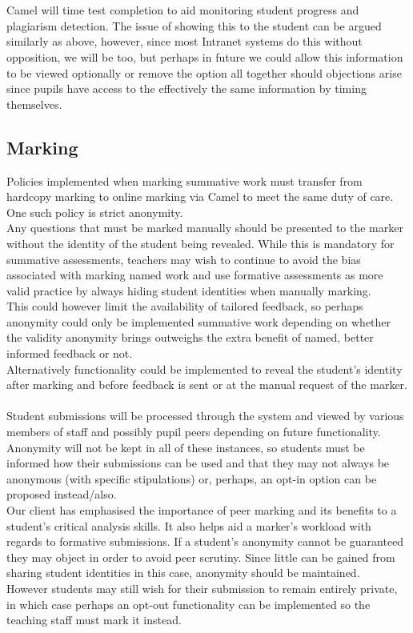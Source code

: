 \\\\Camel will time test completion to aid monitoring student progress and plagiarism detection. The issue of showing this to the student can be argued similarly as above, however, since most Intranet systems do this without opposition, we will be too, but perhaps in future we could allow this information to be viewed optionally or remove the option all together should objections arise since pupils have access to the effectively the same information by timing themselves.
\subsection*{Marking}
Policies implemented when marking summative work must transfer from hardcopy marking to online marking via Camel to meet the same duty of care. One such policy is strict anonymity.
\\Any questions that must be marked manually should be presented to the marker without the identity of the student being revealed. While this is mandatory for summative assessments, teachers may wish to continue to avoid the bias associated with marking named work and use formative assessments as more valid practice by always hiding student identities when manually marking.
\\This could however limit the availability of tailored feedback, so perhaps anonymity could only be implemented summative work depending on whether the validity anonymity brings outweighs the extra benefit of named, better informed feedback or not.
\\Alternatively functionality could be implemented to reveal the student's identity after marking and before feedback is sent or at the manual request of the marker.
\\\\Student submissions will be processed through the system and viewed by various members of staff and possibly pupil peers depending on future functionality. Anonymity will not be kept in all of these instances, so students must be informed how their submissions can be used and that they may not always be anonymous (with specific stipulations) or, perhaps, an opt-in option can be proposed instead/also.
\\Our client has emphasised the importance of peer marking and its benefits to a student's critical analysis skills. It also helps aid a marker's workload with regards to formative submissions. If a student's anonymity cannot be guaranteed they may object in order to avoid peer scrutiny. Since little can be gained from sharing student identities in this case, anonymity should be maintained.
\\However students may still wish for their submission to remain entirely private, in which case perhaps an opt-out functionality can be implemented so the teaching staff must mark it instead.

